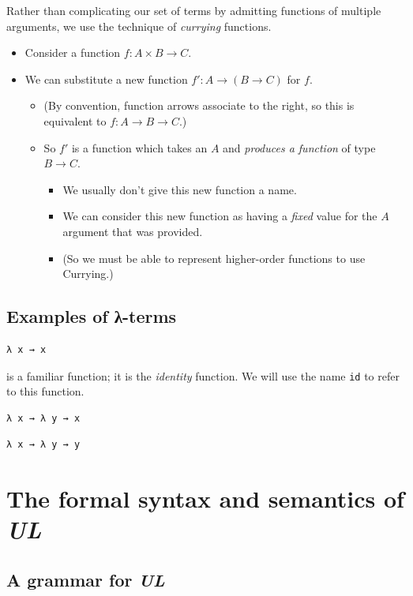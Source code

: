 \documentclass[11pt]{article}
\theoremstyle{definition}
\begin{document}
Rather than complicating our set of terms by admitting
functions of multiple arguments, we use the technique
of \emph{currying} functions.
\begin{itemize}
\item Consider a function \(f : A × B → C\).
\item We can substitute a new function \(f′ : A → (B → C)\)
for \(f\).
\begin{itemize}
\item (By convention, function arrows associate to the right,
so this is equivalent to \(f : A → B → C\).)
\item So \(f′\) is a function which takes an \(A\) and
\emph{produces a function} of type \(B → C\).
\begin{itemize}
\item We usually don't give this new function a name.
\item We can consider this new function as having a \emph{fixed} value
for the \(A\) argument that was provided.
\item (So we must be able to represent higher-order functions
to use Currying.)
\end{itemize}
\end{itemize}
\end{itemize}

\subsection{Examples of λ-terms}
\label{sec:org7796064}

\begin{verbatim}
λ x → x
\end{verbatim}
is a familiar function; it is the \emph{identity} function.
We will use the name \texttt{id} to refer to this function.

\begin{verbatim}
λ x → λ y → x
\end{verbatim}

\begin{verbatim}
λ x → λ y → y
\end{verbatim}

\section{The formal syntax and semantics of \emph{UL}}
\label{sec:orga94d620}

\subsection{A grammar for \emph{UL}}
\label{sec:org6aeedc6}
\end{document}

